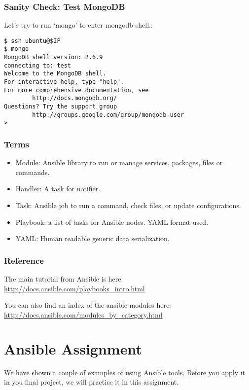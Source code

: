 \subsubsection{Sanity Check: Test
MongoDB}\label{sanity-check-test-mongodb}

Let's try to run `mongo' to enter mongodb shell.:

\begin{verbatim}
$ ssh ubuntu@$IP
$ mongo
MongoDB shell version: 2.6.9
connecting to: test
Welcome to the MongoDB shell.
For interactive help, type "help".
For more comprehensive documentation, see
        http://docs.mongodb.org/
Questions? Try the support group
        http://groups.google.com/group/mongodb-user
> 
\end{verbatim}

\subsubsection{Terms}\label{terms}

\begin{itemize}

\item
  Module: Ansible library to run or manage services, packages, files or
  commands.
\item
  Handler: A task for notifier.
\item
  Task: Ansible job to run a command, check files, or update
  configurations.
\item
  Playbook: a list of tasks for Ansible nodes. YAML format used.
\item
  YAML: Human readable generic data serialization.
\end{itemize}

\subsubsection{Reference}\label{reference}

The main tutorial from Ansible is here:
\url{http://docs.ansible.com/playbooks_intro.html}

You can also find an index of the ansible modules here:
\url{http://docs.ansible.com/modules_by_category.html}
\section{Ansible Assignment}\label{ansible-assignment}

We have shown a couple of examples of using Ansible tools. Before you
apply it in you final project, we will practice it in this assignment.

